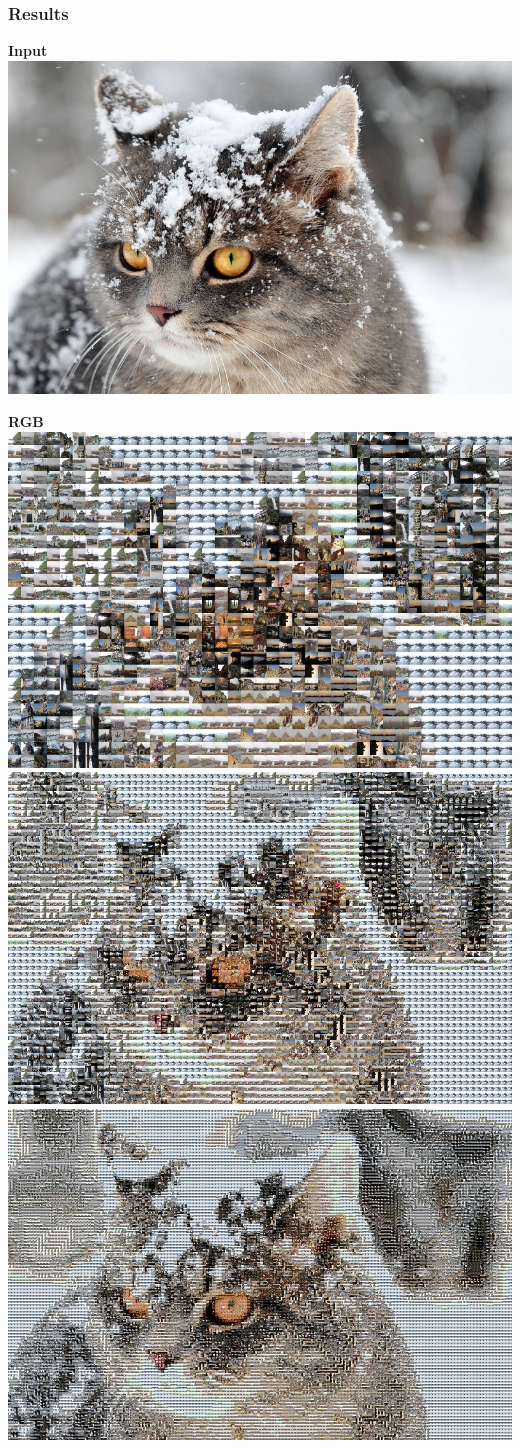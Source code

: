 \documentclass[11pt]{beamer}
\begin{document}
\begin{frame}
\frametitle{Results}
\textbf{Input}\\

\includegraphics[width=.3\textwidth]{cat.jpg}

\textbf{RGB}\\

\includegraphics[width=.35\textwidth]{cat-rgb-20.jpg}
%
\includegraphics[width=.35\textwidth]{cat-rgb-10.jpg}
%
\includegraphics[width=.35\textwidth]{cat-rgb-5.jpg}
\end{frame}
\end{document}
